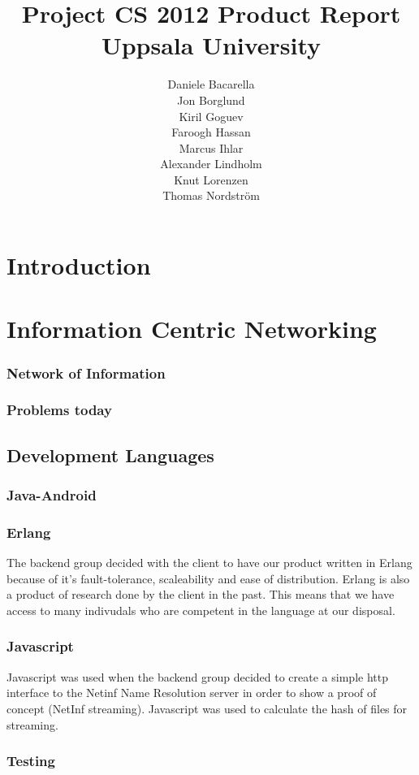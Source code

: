 \documentclass[11pt]{report}
\title{Project CS 2012 Product Report\\Uppsala University\\}
\author{Daniele Bacarella\\
Jon Borglund\\
Kiril Goguev\\
		Faroogh Hassan\\
		Marcus Ihlar\\
		Alexander Lindholm\\
		Knut Lorenzen\\
		Thomas Nordström\\
}
\date{}
\begin{document}
\maketitle

\tableofcontents

\chapter{Introduction}
\chapter{Information Centric Networking}

\subsection{Network of Information}
\subsection{Problems  today}
\section{Development Languages}
\subsection{Java-Android}
\subsection{Erlang}
The backend group decided with the client to have our product written in Erlang because of it's fault-tolerance, scaleability and ease of distribution. Erlang is also a product of research done by the client in the past. This means that we have access to many indivudals who are competent in the language at our disposal. 
\subsection{Javascript}

Javascript was used when the backend group decided to create a simple http interface to the Netinf Name Resolution server in order to show a proof of concept (NetInf streaming). Javascript was used to calculate the hash of files for streaming.

\subsection{Testing}
\end{document}
